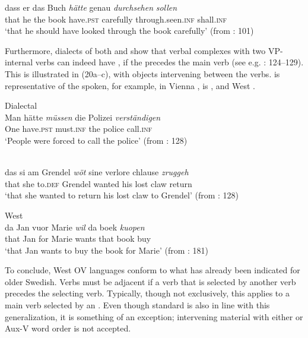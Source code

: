 \documentclass[output=paper, colorlinks, citecolor=brown]{langscibook}
\begin{document}
\ex\label{ex:sangfelt:19b}
\gll dass er das Buch \textit{hätte} {genau} \textit{durchsehen} \textit{sollen}\\
 that he the book have.\textsc{pst} carefully through.seen.\textsc{inf} shall.\textsc{inf} \\
\glt ‘that he should have looked through the book carefully’ (from \citealt{Sheehan2017Final}: 101)
\z 
\z

Furthermore, dialects of both  and  show that verbal complexes with two VP-internal verbs can indeed have , if the  precedes the main verb (see e.g. \citealt{Sapp2011}: 124–129). This is illustrated in (20a–c), with objects intervening between the verbs.  is representative of the  spoken, for example, in Vienna \citep[128]{Haider2013},  is , and  West .


\ea 
\label{ex:sangfelt:20}
\ea Dialectal \label{ex:sangfelt:20a}\\
\gll Man hätte \textit{müssen} {die} {Polizei} \textit{verständigen} \\
 One have.\textsc{pst} must.\textsc{inf} the police call.\textsc{inf} \\
\glt ‘People were forced to call the police’ (from \citealt{Haider2013}: 128)

\ex {}\label{ex:sangfelt:20b}\\
\gll das si am Grendel \textit{wöt} {sine} {verlore} {chlause} \textit{zruggeh}\\
 that she to.\textsc{def} Grendel wanted his lost claw return \\
\glt ‘that she wanted to return his lost claw to Grendel’ (from \citealt{Haider2013}: 128)

\ex West \label{ex:sangfelt:20c}\\
\gll da Jan vuor Marie \textit{wil} {da} {boek} \textit{kuopen} \\
 that Jan for Marie wants that book buy \\
\glt ‘that Jan wants to buy the book for Marie’ (from \citealt{Haegeman1992}: 181)\\
\z
\z

To conclude, West  OV languages conform to what has already been indicated for older Swedish. Verbs must be adjacent if a verb that is selected by another verb precedes the selecting verb. Typically, though not exclusively, this applies to a main verb selected by an . Even though standard  is also in line with this generalization, it is something of an exception; intervening material with either  or Aux-V word order is not accepted.
\end{document}
